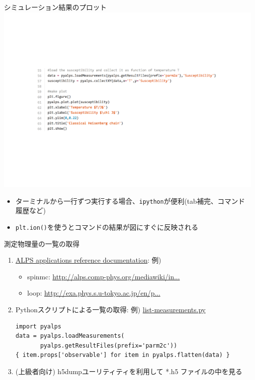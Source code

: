 \subsection*{\redb\whiteb\greenb}

\begin{frame}[t,fragile]{シミュレーション結果のプロット}
  \includegraphics[height=.5\textheight]{tutorial2a-3.pdf}
  \begin{itemize}
  \item ターミナルから一行ずつ実行する場合、{\color{red}\tt ipython}が便利(tab補完、コマンド履歴など)
  \item {\color{red}\tt plt.ion()}を使うとコマンドの結果が図にすぐに反映される
  \end{itemize}
\end{frame}

\begin{frame}[t,fragile]{測定物理量の一覧の取得}
  \begin{enumerate}
    \setlength{\itemsep}{1em}
  \item \href{http://alps.comp-phys.org/mediawiki/index.php/ALPS_2_Documentation:Overview}{ALPS applications reference documentation}: 例)
    \begin{itemize}
    \item spinmc: {\footnotesize \href{http://alps.comp-phys.org/mediawiki/index.php/Documentation:ClassicalMCSimulations}{http://alps.comp-phys.org/mediawiki/in...}}
    \item loop: {\footnotesize \href{http://exa.phys.s.u-tokyo.ac.jp/en/projects/alps-looper}{http://exa.phys.s.u-tokyo.ac.jp/en/p...}}
    \end{itemize}
  \item Pythonスクリプトによる一覧の取得: 例) \href{https://gist.github.com/wistaria/71cb8d7a22f45bfe256d}{list-measurements.py}
\begin{lstlisting}
import pyalps
data = pyalps.loadMeasurements(
       pyalps.getResultFiles(prefix='parm2c'))
{ item.props['observable'] for item in pyalps.flatten(data) }
\end{lstlisting}
  \item (上級者向け) h5dumpユーリティティを利用して *.h5 ファイルの中を見る
  \end{enumerate}
\end{frame}

